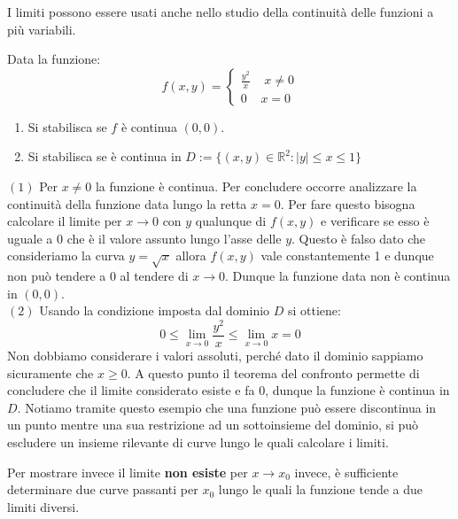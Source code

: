 \documentclass[a4paper]{article}
\numberwithin{equation}{subsection}
\begin{document}
I limiti possono essere usati anche nello studio della continuità delle funzioni a più variabili.
\ex{}
{
    Data la funzione:
    \[f(x,y) = \begin{cases}
        \frac{y^2}{x}\; \; \; \; x \neq 0\\
        0 \; \; \; \; x = 0
    \end{cases}\]
    \begin{enumerate}
        \item Si stabilisca se $f$ è continua $(0,0)$.
        \item Si stabilisca se è continua in $D := \{(x,y) \in \mathbb{R}^2 : |y| \le x \le 1\}$
    \end{enumerate}
    $(1)$ Per $x \neq 0$ la funzione è continua. Per concludere occorre analizzare la continuità della funzione
    data lungo la retta $x = 0$. Per fare questo bisogna calcolare il limite per $x \rightarrow 0$ con $y$ qualunque
    di $f(x,y)$ e verificare se esso è uguale a 0 che è il valore assunto lungo l'asse delle $y$. Questo è falso dato che consideriamo la curva
    $y = \sqrt{x}$ allora $f(x,y)$ vale constantemente 1 e dunque non può tendere a $0$ al tendere di $x \rightarrow 0$. Dunque la funzione data non è continua in $(0,0)$. \\
    $(2)$ Usando la condizione imposta dal dominio $D$ si ottiene:
    \[0 \le \lim_{x \rightarrow 0} \frac{y^2}{x} \le \lim_{x \rightarrow 0} x = 0\]
    Non dobbiamo considerare i valori assoluti, perché dato il dominio sappiamo sicuramente che $x \ge 0$. 
    A questo punto il teorema del confronto permette di concludere che il limite considerato esiste e fa $0$, dunque la funzione è continua in $D$.
    Notiamo tramite questo esempio che una funzione può essere discontinua in un punto mentre una sua restrizione ad un sottoinsieme del dominio,
    si può escludere un insieme rilevante di curve lungo le quali calcolare i limiti. 
}
\noindent
Per mostrare invece il limite \textbf{non esiste} per $x \rightarrow x_0$ invece, è sufficiente determinare due curve passanti
per $x_0$ lungo le quali la funzione tende a due limiti diversi. 
\ex{}
\end{document}
